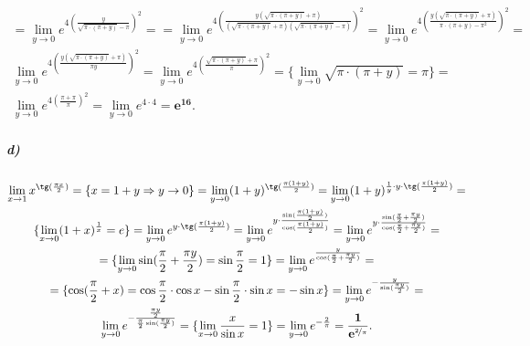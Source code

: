 \documentclass[12pt]{article}
\begin{document}
            \begin{gather*}
                = \lim_{y \to 0} e^{4\left(\frac{y}{\sqrt{\pi \cdot (\pi + y)} - \pi}\right)^2} =
                = \lim_{y \to 0} e^{4\left(\frac{y(\sqrt{\pi \cdot (\pi + y)} + \pi)}{(\sqrt{\pi \cdot (\pi + y)} + \pi)(\sqrt{\pi \cdot (\pi + y)} - \pi)}\right)^2} =
                \lim_{y \to 0} e^{4\left(\frac{y(\sqrt{\pi \cdot (\pi + y)} + \pi)}{\pi\cdot (\pi + y) - \pi^2}\right)^2} =\\
                \lim_{y \to 0} e^{4\left(\frac{y(\sqrt{\pi \cdot (\pi + y)} + \pi)}{\pi y}\right)^2} =
                \lim_{y \to 0} e^{4\left(\frac{\sqrt{\pi \cdot (\pi + y)} + \pi}{\pi}\right)^2} =
                \{\lim_{y \to 0} \sqrt{\pi \cdot (\pi + y)} = \pi\} =\\
                \lim_{y \to 0} e^{4\left(\frac{\pi + \pi}{\pi}\right)^2} =
                \lim_{y \to 0} e^{4 \cdot 4} = \mathbf{e^{16}}.
            \end{gather*}
        \subparagraph{d)}
            \begin{gather*}
                \lim_{x \to 1} x^{\tg(\frac{\pi x}{2})} =
                \{x = 1 + y \Rightarrow y \to 0 \} =
                \lim_{y \to 0} (1 + y)^{\tg(\frac{\pi (1 + y)}{2})} =
                \lim_{y \to 0} (1 + y)^{\frac{1}{y} \cdot y \cdot \tg(\frac{\pi (1 + y)}{2})} =\\
                \{\lim_{x \to 0} (1 + x)^{\frac{1}{x}} = e\} =
                \lim_{y \to 0} e^{y \cdot \tg(\frac{\pi (1 + y)}{2})} =
                \lim_{y \to 0} e^{y \cdot \frac{\sin(\frac{\pi (1 + y)}{2})}{\cos(\frac{\pi (1+y)}{2})}} =
                \lim_{y \to 0} e^{y \cdot \frac{\sin(\frac{\pi}{2} + \frac{\pi y}{2})}{\cos(\frac{\pi}{2} + \frac{\pi y}{2})}} =\\
                = \{\lim_{y \to 0} \sin(\frac{\pi}{2} + \frac{\pi y}{2}) = \sin{\frac{\pi}{2}} = 1\} =
                \lim_{y \to 0} e^{\frac{y}{\cos(\frac{\pi}{2} + \frac{\pi y}{2})}} =\\
                = \{\cos(\frac{\pi}{2} + x) = \cos{\frac{\pi}{2}} \cdot \cos{x} - \sin{\frac{\pi}{2}} \cdot \sin{x} = -\sin{x}\} =
                \lim_{y \to 0} e^{-\frac{y}{\sin(\frac{\pi y}{2})}} =\\
                \lim_{y \to 0} e^{-\frac{\frac{\pi y}{2}}{\frac{\pi}{2}\sin(\frac{\pi y}{2})}} =
                \{\lim_{x \to 0} \frac{x}{\sin{x}} = 1\} =
                \lim_{y \to 0} e^{-\frac{2}{\pi}} = \mathbf{\frac{1}{e^{\nicefrac{2}{\pi}}}}.
            \end{gather*}
\end{document}
